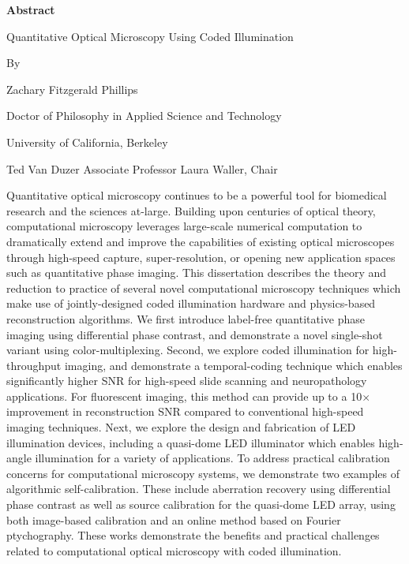 \setcounter{page}{1}
\begin{center}
    \textbf{Abstract}

    \vspace{1.2cm}
     Quantitative Optical Microscopy Using Coded Illumination

    \vspace{0.4cm}

    By

    \vspace{0.4cm}
    Zachary Fitzgerald Phillips

     \vspace{0.4cm}
     Doctor of Philosophy in Applied Science and Technology

     \vspace{0.4cm}
     University of California, Berkeley

     \vspace{0.4cm}
     Ted Van Duzer Associate Professor Laura Waller, Chair

    \vspace{0.8cm}


\end{center}


Quantitative optical microscopy continues to be a powerful tool for biomedical research and the sciences at-large. Building upon centuries of optical theory, computational microscopy leverages large-scale numerical computation to dramatically extend and improve the capabilities of existing optical microscopes through high-speed capture, super-resolution, or opening new application spaces such as quantitative phase imaging. This dissertation describes the theory and reduction to practice of several novel computational microscopy techniques which make use of jointly-designed coded illumination hardware and physics-based reconstruction algorithms. We first introduce label-free quantitative phase imaging using differential phase contrast, and demonstrate a novel single-shot variant using color-multiplexing. Second, we explore coded illumination for high-throughput imaging, and demonstrate a temporal-coding technique which enables significantly higher SNR for high-speed slide scanning and neuropathology applications. For fluorescent imaging, this method can provide up to a 10$\times$ improvement in reconstruction SNR compared to conventional high-speed imaging techniques. Next, we explore the design and fabrication of LED illumination devices, including a quasi-dome LED illuminator which enables high-angle illumination for a variety of applications. To address practical calibration concerns for computational microscopy systems, we demonstrate two examples of algorithmic self-calibration. These include aberration recovery using differential phase contrast as well as source calibration for the quasi-dome LED array, using both image-based calibration and an online method based on Fourier ptychography. These works demonstrate the benefits and practical challenges related to computational optical microscopy with coded illumination.
